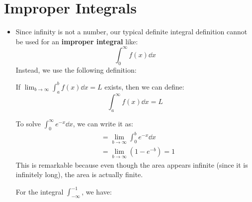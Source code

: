 \section{Improper Integrals}
\begin{itemize}
    \item Since infinity is not a number, our typical definite integral definition cannot be used for an \textbf{improper integral} like:
    \begin{equation}
        \int_0^\infty f(x) \dd{x}
    \end{equation}
    Instead, we use the following definition:
    \begin{definition}
        If $\lim_{b\to\infty} \int_a^b f(x) \dd{x} = L$ exists, then we can define:
        \begin{equation}
            \int_a^\infty f(x) \dd{x} = L
        \end{equation}
    \end{definition}
    \begin{example}
        To solve $\int_0^\infty e^{-x} \dd{x}$, we can write it as:
        \begin{align}
            &= \lim_{b\to \infty} \int_0^b e^{-x} \dd{x} \\ 
            &= \lim_{b\to \infty} \left(1-e^{-b}\right) = 1
        \end{align}
        This is remarkable because even though the area appears infinite (since it is infinitely long), the area is actually finite.
        \begin{center}
        \end{center}
    \end{example}
    \begin{example}
        For the integral $\int_{-\infty}^{-1}$, we have:
        \begin{align}

\end{align}
\end{example}
\end{itemize}
